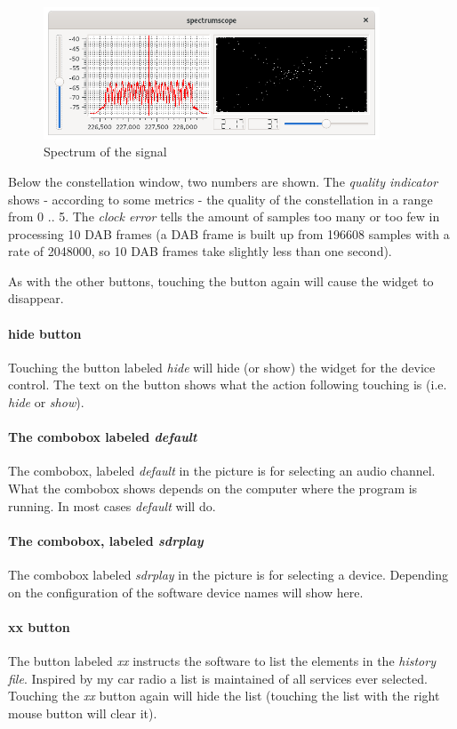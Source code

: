 \documentclass[12pt]{article}
\begin{document}
\begin{figure}[htp]
\centering
\includegraphics[width=100mm]{qt-dab-spectrum-button.png}
\caption{Spectrum of the signal}
\label{figure:spectrum}
\end{figure}

Below the constellation window, two numbers are shown.
The {\em quality indicator} shows - according to some metrics - the quality
of the constellation in a range from 0 .. 5. The {\em clock error} tells
the amount of samples too many or too few in processing 10 DAB frames
(a DAB frame is built up from 196608 samples with a rate of 2048000, so
10 DAB frames take slightly less than one second).
\par
As with the other buttons, touching the button again will cause the
widget to disappear.
\paragraph{hide button}
Touching the button labeled {\em hide} will hide
(or show) the widget for the 
device control. The text on the button shows what the action
following touching is (i.e. {\em hide} or {\em show}).

\paragraph{The combobox labeled {\em default}}
The combobox, labeled {\em default} in the picture is for selecting
an audio channel. What the combobox shows depends on the computer
where the program is running. In most cases {\em default} will do.
\paragraph{The combobox, labeled {\em sdrplay}}
The combobox labeled {\em sdrplay} in the picture is for selecting
a device. Depending on the configuration of the software device names will
show here.
\paragraph{xx button}
The  button labeled {\em xx} instructs the software to list the elements
in the {\em history file}.
Inspired by my car radio a list is
maintained of all services ever selected. Touching the {\em xx} button
again will hide the list (touching the list with the right mouse button
will clear it).
\end{document}
